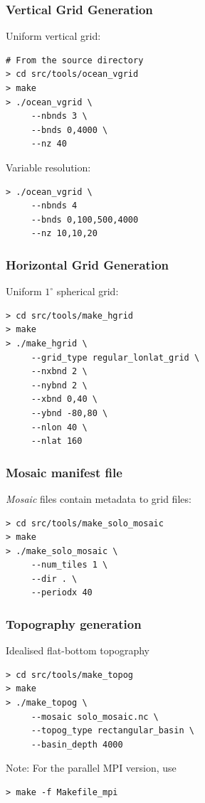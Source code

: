 \documentclass[red]{beamer}
\begin{document}
\begin{frame}[fragile]
    \frametitle{Vertical Grid Generation}
    
    Uniform vertical grid:
    \begin{lstlisting}
# From the source directory
> cd src/tools/ocean_vgrid
> make
> ./ocean_vgrid \
     --nbnds 3 \
     --bnds 0,4000 \
     --nz 40
    \end{lstlisting}
    
    Variable resolution:
    \begin{lstlisting}
> ./ocean_vgrid \
     --nbnds 4
     --bnds 0,100,500,4000
     --nz 10,10,20
    \end{lstlisting}
\end{frame}
\begin{frame}[fragile]
    \frametitle{Horizontal Grid Generation}
   
    Uniform $1^\circ$ spherical grid:
    \begin{lstlisting}
> cd src/tools/make_hgrid
> make
> ./make_hgrid \
     --grid_type regular_lonlat_grid \
     --nxbnd 2 \
     --nybnd 2 \
     --xbnd 0,40 \
     --ybnd -80,80 \
     --nlon 40 \
     --nlat 160
    \end{lstlisting}
\end{frame}

\begin{frame}[fragile]
    \frametitle{Mosaic manifest file}
    
    \textit{Mosaic} files contain metadata to grid files:
    \begin{lstlisting}
> cd src/tools/make_solo_mosaic
> make
> ./make_solo_mosaic \
     --num_tiles 1 \
     --dir . \
     --periodx 40
    \end{lstlisting}
\end{frame}

\begin{frame}[fragile]
    \frametitle{Topography generation}
   
    Idealised flat-bottom topography
    \begin{lstlisting}
> cd src/tools/make_topog
> make
> ./make_topog \
     --mosaic solo_mosaic.nc \
     --topog_type rectangular_basin \
     --basin_depth 4000
    \end{lstlisting}

    Note: For the parallel MPI version, use
    \begin{lstlisting}
> make -f Makefile_mpi
    \end{lstlisting}
\end{frame}
\end{document}
